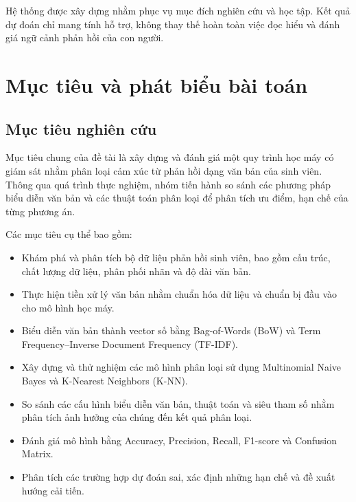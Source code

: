 Hệ thống được xây dựng nhằm phục vụ mục đích nghiên cứu và học tập. Kết quả dự đoán chỉ mang tính hỗ trợ, không thay thế hoàn toàn việc đọc hiểu và đánh giá ngữ cảnh phản hồi của con người.



\section{Mục tiêu và phát biểu bài toán}

\subsection{Mục tiêu nghiên cứu}

Mục tiêu chung của đề tài là xây dựng và đánh giá một quy trình học máy có giám sát nhằm phân loại cảm xúc từ phản hồi dạng văn bản của sinh viên. Thông qua quá trình thực nghiệm, nhóm tiến hành so sánh các phương pháp biểu diễn văn bản và các thuật toán phân loại để phân tích ưu điểm, hạn chế của từng phương án.

Các mục tiêu cụ thể bao gồm:

\begin{itemize}
    \item Khám phá và phân tích bộ dữ liệu phản hồi sinh viên, bao gồm cấu trúc, chất lượng dữ liệu, phân phối nhãn và độ dài văn bản.

    \item Thực hiện tiền xử lý văn bản nhằm chuẩn hóa dữ liệu và chuẩn bị đầu vào cho mô hình học máy.

    \item Biểu diễn văn bản thành vector số bằng Bag-of-Words (BoW) và Term Frequency--Inverse Document Frequency (TF-IDF).

    \item Xây dựng và thử nghiệm các mô hình phân loại sử dụng Multinomial Naive Bayes và K-Nearest Neighbors (K-NN).

    \item So sánh các cấu hình biểu diễn văn bản, thuật toán và siêu tham số nhằm phân tích ảnh hưởng của chúng đến kết quả phân loại.

    \item Đánh giá mô hình bằng Accuracy, Precision, Recall, F1-score và Confusion Matrix.

    \item Phân tích các trường hợp dự đoán sai, xác định những hạn chế và đề xuất hướng cải tiến.
\end{itemize}


